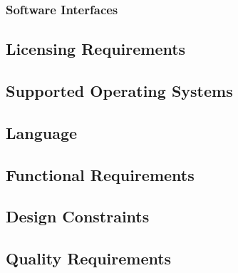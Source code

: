 	\subsubsection{Software Interfaces}
	\label{requirements:interfaces:software}

	

\subsection{Licensing Requirements}
\label{requirements:license}

\subsection{Supported Operating Systems}
\label{requirements:os}

\subsection{Language}
\label{requirements:language}


\subsection{Functional Requirements} %
\label{requirements:functional}


\subsection{Design Constraints}
\label{requirements:constraints}

\subsection{Quality Requirements}
\label{requirements:quality}

